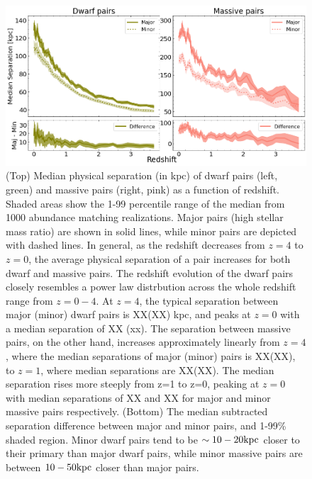 \documentclass[twocolumn]{aastex631}
\begin{document}
\begin{figure}[htb]
  \centering
  \includegraphics[width=\textwidth]{separation.png}
  \caption{(Top) Median physical separation (in kpc) of dwarf pairs (left, green) and massive pairs (right, pink) as a function of redshift. 
  Shaded areas show the 1-99 percentile range of the median from 1000 abundance matching realizations. 
  Major pairs (high stellar mass ratio) are shown in solid lines, while minor pairs are depicted with dashed lines.
  In general, as the redshift decreases from $z=4$ to $z=0$, the average physical separation of a pair increases for both dwarf and massive pairs. 
  The redshift evolution of the dwarf pairs closely resembles a power law distrbution across the whole redshift range from $z=0-4$.
  At $z=4$, the typical separation between major (minor) dwarf pairs is XX(XX) kpc, and peaks at $z=0$ with a median separation of XX (xx).
  The separation between massive pairs, on the other hand, increases approximately linearly from $z=4$, where the median separations of major (minor) pairs is XX(XX), to $z=1$, where median separations are XX(XX). The median separation rises more steeply from z=1 to z=0, peaking at $z=0$ with median separations of XX and XX for major and minor massive pairs respectively.
  (Bottom) The median subtracted separation difference between major and minor pairs, and 1-99\% shaded region.
  Minor dwarf pairs tend to be $\sim10-20\mathrm{kpc}$ closer to their primary than major dwarf pairs, while minor massive pairs are between $10-50\mathrm{kpc}$ closer than major pairs.  
    }
  \label{fig:sep}
\end{figure}
\end{document}
